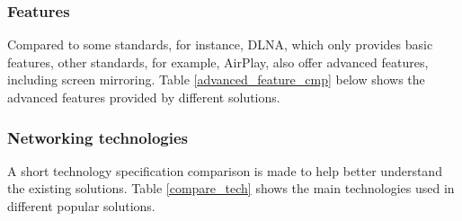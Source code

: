 \subsubsection{Features\label{2_3_3_5}}
Compared to some standards, for instance, DLNA, which only provides basic
features, other standards, for example, AirPlay, also offer advanced features,
including screen mirroring. Table \ref{advanced_feature_cmp} below shows the
advanced features provided by different solutions.

\begin{table}[htb] 
\caption{Advanced feature comparison \label{advanced_feature_cmp}} 
\begin{center} 
\end{center} 
\end{table} 

\subsubsection{Networking technologies\label{2_3_3_2}}
A short technology specification comparison is made to help better understand
the existing solutions. Table \ref{compare_tech} shows the main technologies
used in different popular solutions.

\begin{table}[htb] 
\caption{Comparison of used technologies\label{compare_tech}} 
\begin{center} 
\end{center} 
\end{table} 

